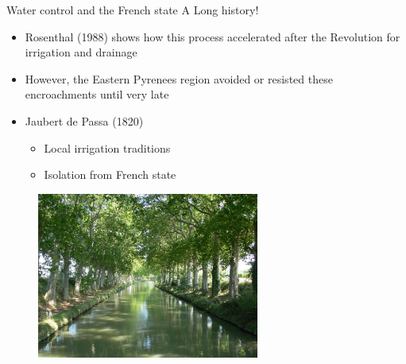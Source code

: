 \documentclass[newPxFont]{beamer}
\begin{document}

\begin{frame}[c]{Water control and the French state}
\vspace{-2em}
A Long history!

\begin{itemize}
	\item Rosenthal (1988) shows how this process accelerated after the Revolution for irrigation and drainage
	\item However, the Eastern Pyrenees region avoided or resisted these encroachments until very late
	\item Jaubert de Passa (1820)
	\begin{itemize}
		\item Local irrigation traditions
		\item Isolation from French state
	\end{itemize}
\end{itemize}
\begin{figure}
	\centering
	\includegraphics[width = 0.65\textwidth]{img/canal_midi}
\end{figure}
\end{frame}

\end{document}
